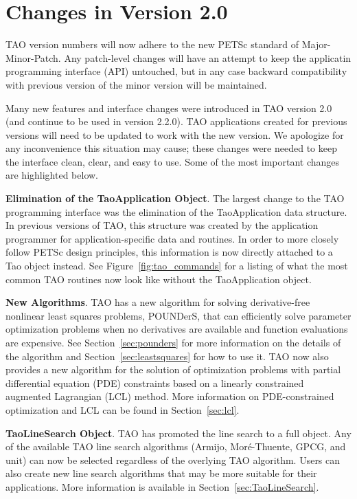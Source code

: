 \documentclass[]{book}
\begin{document}
\section*{Changes in Version 2.0}

TAO version numbers will now adhere to the new PETSc standard of 
Major-Minor-Patch. Any patch-level changes will have an attempt to keep the 
applicatin programming interface (API) untouched, but in any case backward 
compatibility with previous version of the minor version will be 
maintained.

Many new features and interface changes were introduced in TAO version 2.0 (and continue to be used in version 2.2.0).
TAO applications created for previous versions will need to be updated to 
work with the new version.  We apologize for any inconvenience this situation
may cause; these changes were needed to keep the interface
clean, 
clear, and easy to use. Some of the most important changes are highlighted 
below.

\vspace{7mm}
\noindent \textbf{Elimination of the TaoApplication Object}. The largest change to the TAO programming interface was the elimination of the
TaoApplication data structure. In previous versions of TAO, this structure was 
created by the application programmer for application-specific data and 
routines.  In order to more closely follow PETSc design principles, this 
information is now directly attached to a Tao object instead.  See 
Figure~\ref{fig:tao_commands} for a listing of what the most common TAO 
routines now look like without the TaoApplication object.

\vspace{7mm}
\noindent \textbf{New Algorithms}. TAO has a new algorithm for solving derivative-free nonlinear least
squares
problems, POUNDerS, that can efficiently solve parameter optimization problems 
when no derivatives are available and function evaluations are expensive. 
See 
Section~\ref{sec:pounders} for more information on the details of the 
algorithm and Section~\ref{sec:leastsquares} for how to use it.
TAO now also provides a new algorithm for the solution of optimization
problems with partial differential equation (PDE) constraints based on a
linearly constrained augmented Lagrangian (LCL) method.  More 
information on PDE-constrained optimization and LCL can be found 
in Section~\ref{sec:lcl}.


\vspace{7mm}
\noindent \textbf{TaoLineSearch Object}. TAO has promoted the line search to a full object.  Any of the available 
TAO line search algorithms (Armijo, Mor\'e-Thuente, GPCG, and unit) can now 
be selected regardless of the overlying TAO algorithm.  Users can also
create new line search algorithms that may be more suitable for their
applications.  More information is available in 
Section~\ref{sec:TaoLineSearch}.
\end{document}
